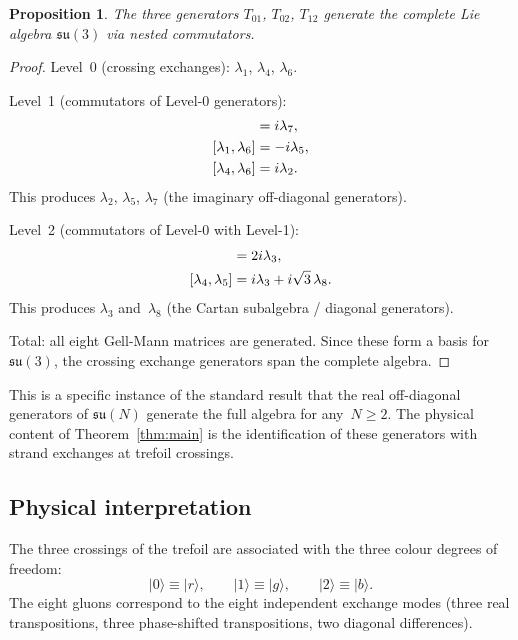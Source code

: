 \documentclass[11pt,a4paper]{article}
\newtheorem{proposition}{Proposition}
\begin{document}
\begin{proposition}
The three generators $T_{01}$, $T_{02}$, $T_{12}$ generate
the complete Lie algebra $\mathfrak{su}(3)$ via nested
commutators.
\end{proposition}

\begin{proof}
Level~0 (crossing exchanges):
$\lambda_1$, $\lambda_4$, $\lambda_6$.

Level~1 (commutators of Level-0 generators):
\begin{align}
  [\lambda_1, \lambda_4] &= i\lambda_7, \notag \\
  [\lambda_1, \lambda_6] &= -i\lambda_5, \label{eq:level1} \\
  [\lambda_4, \lambda_6] &= i\lambda_2. \notag
\end{align}
This produces $\lambda_2$, $\lambda_5$, $\lambda_7$ (the
imaginary off-diagonal generators).

Level~2 (commutators of Level-0 with Level-1):
\begin{align}
  [\lambda_1, \lambda_2] &= 2i\lambda_3, \notag \\
  [\lambda_4, \lambda_5] &= i\lambda_3 + i\sqrt{3}\,\lambda_8.
  \label{eq:level2}
\end{align}
This produces $\lambda_3$ and~$\lambda_8$ (the Cartan
subalgebra / diagonal generators).

Total: all eight Gell-Mann matrices are generated.
Since these form a basis for $\mathfrak{su}(3)$, the crossing
exchange generators span the complete algebra.
\end{proof}

This is a specific instance of the standard result that the
real off-diagonal generators of $\mathfrak{su}(N)$ generate the
full algebra for any~$N \geq 2$.  The physical content of
Theorem~\ref{thm:main} is the identification of these generators
with strand exchanges at trefoil crossings.


\subsection{Physical interpretation}

The three crossings of the trefoil are associated with the three
colour degrees of freedom:
\begin{equation}
  |0\rangle \equiv |r\rangle, \qquad
  |1\rangle \equiv |g\rangle, \qquad
  |2\rangle \equiv |b\rangle.
  \label{eq:colours}
\end{equation}
The eight gluons correspond to the eight independent exchange
modes (three real transpositions, three phase-shifted
transpositions, two diagonal differences).
\end{document}
